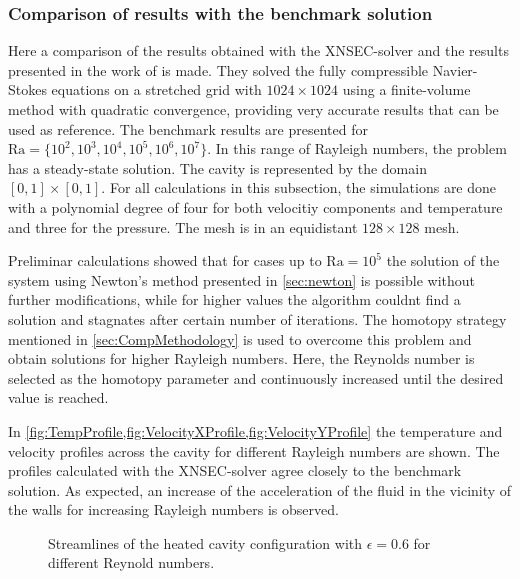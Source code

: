 \subsubsection{Comparison of results with the benchmark solution}

Here a comparison of the results obtained with the XNSEC-solver and the results presented in the work of \textcite{vierendeelsBenchmarkSolutionsNatural2003} is made. They solved the fully compressible Navier-Stokes equations on a stretched grid with $1024\times1024$ using a finite-volume method with quadratic convergence, providing very accurate results that can be used as reference.
The benchmark results are presented for $\text{Ra} = \{10^2,10^3,10^4,10^5,10^6,10^7\}$. In this range of Rayleigh numbers, the problem has a steady-state solution. 
The cavity is represented by the domain $[0,1]\times[0,1]$. For all calculations in this subsection, the simulations are done with a polynomial degree of four for both velocitiy components and temperature and three for the pressure. The mesh is in an equidistant $128\times128$ mesh.

Preliminar calculations showed that for cases up to $\text{Ra} = 10^5$ the solution of the system using Newton's method presented in \cref{sec:newton} is possible without further modifications, while for higher values the algorithm couldnt find a solution and stagnates after certain number of iterations. The homotopy strategy mentioned in \cref{sec:CompMethodology} is used to overcome this problem and obtain solutions for higher Rayleigh numbers. Here, the Reynolds number is selected as the homotopy parameter and continuously increased until the desired value is reached.

In \cref{fig:TempProfile,fig:VelocityXProfile,fig:VelocityYProfile} the temperature and velocity profiles across the cavity for different Rayleigh numbers are shown. The profiles calculated with the XNSEC-solver agree closely to the benchmark solution. As expected, an increase of the acceleration of the fluid in the vicinity of the walls for increasing Rayleigh numbers is observed.
\begin{figure}[h]
	\centering
	\pgfplotsset{width=0.3 \textwidth, compat=1.3}
	\caption{Streamlines of the heated cavity configuration with $\epsilon = 0.6$ for different Reynold numbers.}\label{fig:HSCStreamlines}
\end{figure}



